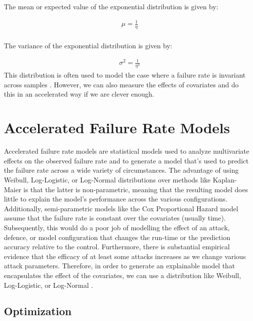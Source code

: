 \documentclass[conference]{IEEEtran}
\begin{document}
The mean or expected value of the exponential distribution is given by:

\begin{align*}
& \mu = \frac{1}{\eta}\\
\end{align*}

The variance of the exponential distribution is given by:

\begin{align*}
& \sigma^2 = \frac{1}{\eta^2}
\end{align*}
This distribution is often used to model the case where a failure rate is invariant across samples \cite{aft_models}. However, we can also measure the effects of covariates and do this in an accelerated way if we are clever enough.


\section{Accelerated Failure Rate Models}


Accelerated failure rate models are statistical models used to analyze multivariate effects on the observed failure rate and to generate a model that's used to predict the failure rate across a wide variety of circumstances. The advantage of using Weibull, Log-Logistic, or Log-Normal distributions over methods like Kaplan-Maier \cite{aft_models} is that the latter is non-parametric, meaning that the resulting model does little to explain the model's performance across the various configurations. Additionally, semi-parametric models like the Cox Proportional Hazard model assume that the failure rate is constant over the covariates (usually time). Subsequently, this would do a poor job of modelling the effect of an attack, defence, or model configuration that changes the run-time or the prediction accuracy relative to the control. Furthermore, there is substantial empirical evidence \cite{meyers} that the efficacy of at least some attacks increases as we change various attack parameters. Therefore, in order to generate an explainable model that encapsulates the effect of the covariates,  we can use a distribution like Weibull, Log-Logistic, or Log-Normal \cite{aft_models}.

\subsection{Optimization}
\end{document}
